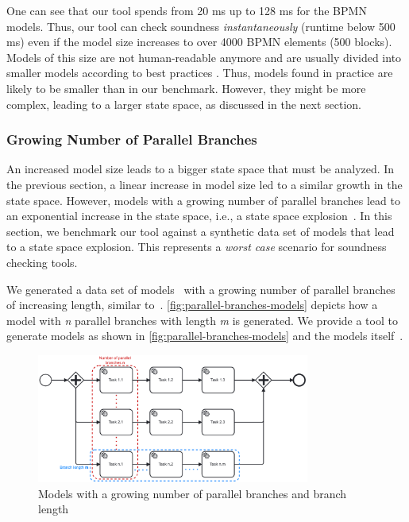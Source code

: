 \documentclass[runningheads]{llncs}
\begin{document}
One can see that our tool spends from 20 ms up to 128 ms for the BPMN models.
Thus, our tool can check soundness \textit{instantaneously} (runtime below 500 ms) even if the model size increases to over 4000 BPMN elements (500 blocks).
Models of this size are not human-readable anymore and are usually divided into smaller models according to best practices \cite{fahlandAnalysisDemandInstantaneous2011}.
Thus, models found in practice are likely to be smaller than in our benchmark.
However, they might be more complex, leading to a larger state space, as discussed in the next section.

\subsubsection{Growing Number of Parallel Branches}
An increased model size leads to a bigger state space that must be analyzed.
In the previous section, a linear increase in model size led to a similar growth in the state space.
However, models with a growing number of parallel branches lead to an exponential increase in the state space, i.e., a state space explosion~\cite{valmariStateExplosionProblem1998}.
In this section, we benchmark our tool against a synthetic data set of models that lead to a state space explosion.
This represents a \textit{worst case} scenario for soundness checking tools.

We generated a data set of models~\cite{noauthorgivenBPM2024Artifacts2024} with a growing number of parallel branches of increasing length, similar to~\cite{corradiniFormalApproachAnalysis2021}.
\autoref{fig:parallel-branches-models} depicts how a model with \textit{n} parallel branches with length \textit{m} is generated.
We provide a tool to generate models as shown in \autoref{fig:parallel-branches-models} and the models itself~\cite{noauthorgivenBPM2024Artifacts2024}.

\begin{figure}[ht]
	\centering
	\includegraphics[width=0.8\textwidth]{images/parallel-branches}
	\caption{Models with a growing number of parallel branches and branch length}
	\label{fig:parallel-branches-models}
\end{figure}
\end{document}
